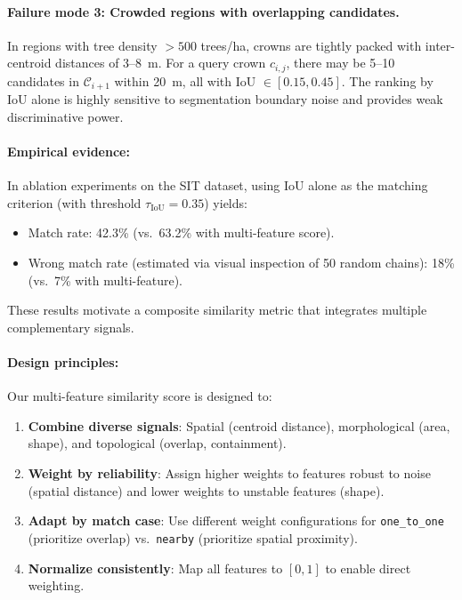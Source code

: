\paragraph{Failure mode 3: Crowded regions with overlapping candidates.}
In regions with tree density $>500$ trees/ha, crowns are tightly packed with inter-centroid distances of 3--8~m. For a query crown $c_{i,j}$, there may be 5--10 candidates in $\mathcal{C}_{i+1}$ within 20~m, all with IoU $\in [0.15, 0.45]$. The ranking by IoU alone is highly sensitive to segmentation boundary noise and provides weak discriminative power.

\paragraph{Empirical evidence:}
In ablation experiments on the SIT dataset, using IoU alone as the matching criterion (with threshold $\tau_{\text{IoU}} = 0.35$) yields:
\begin{itemize}
    \item Match rate: 42.3\% (vs.\ 63.2\% with multi-feature score).
    \item Wrong match rate (estimated via visual inspection of 50 random chains): 18\% (vs.\ 7\% with multi-feature).
\end{itemize}
These results motivate a composite similarity metric that integrates multiple complementary signals.

\paragraph{Design principles:}
Our multi-feature similarity score is designed to:
\begin{enumerate}
    \item \textbf{Combine diverse signals}: Spatial (centroid distance), morphological (area, shape), and topological (overlap, containment).
    \item \textbf{Weight by reliability}: Assign higher weights to features robust to noise (spatial distance) and lower weights to unstable features (shape).
    \item \textbf{Adapt by match case}: Use different weight configurations for \texttt{one\_to\_one} (prioritize overlap) vs.\ \texttt{nearby} (prioritize spatial proximity).
    \item \textbf{Normalize consistently}: Map all features to $[0,1]$ to enable direct weighting.
\end{enumerate}

